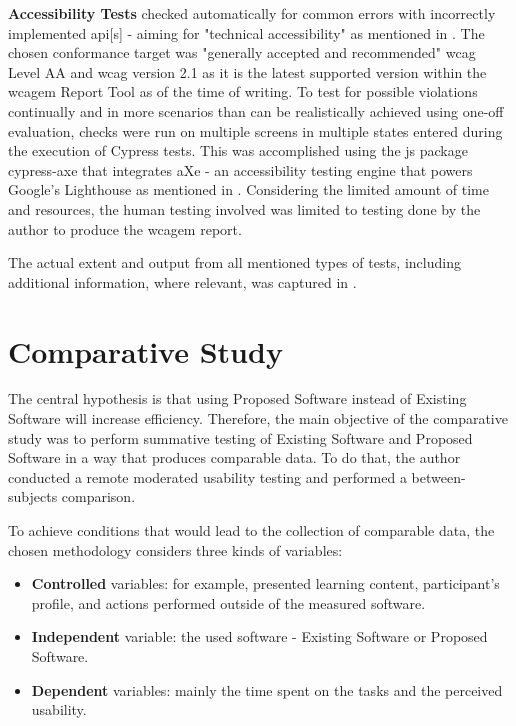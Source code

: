 \textbf{Accessibility Tests} checked automatically for common errors with incorrectly implemented \gls{api}[s] - aiming for "technical accessibility" as mentioned in .
The chosen conformance target was "generally accepted and recommended" \gls{wcag} Level AA \parencite{WAI_Evaluation_Methodology_Note} and \gls{wcag} version 2.1 as it is the latest supported version within the \gls{wcagem} Report Tool as of the time of writing.
To test for possible violations continually and in more scenarios than can be realistically achieved using one-off evaluation, checks were run on multiple screens in multiple states entered during the execution of Cypress tests.
This was accomplished using the \gls{js} package cypress-axe that integrates aXe - an accessibility testing engine that powers Google's Lighthouse as mentioned in .
Considering the limited amount of time and resources, the human testing involved was limited to testing done by the author to produce the \gls{wcagem} report.

The actual extent and output from all mentioned types of tests, including additional information, where relevant, was captured in .

\section{Comparative Study}

The central hypothesis is that using Proposed Software instead of Existing Software will increase efficiency.
Therefore, the main objective of the comparative study was to perform summative testing of Existing Software and Proposed Software in a way that produces comparable data.
To do that, the author conducted a remote moderated usability testing and performed a between-subjects comparison.

To achieve conditions that would lead to the collection of comparable data, the chosen methodology considers three kinds of variables:

\begin{itemize}
    \item \textbf{Controlled} variables: for example, presented learning content, participant's profile, and actions performed outside of the measured software.
    \item \textbf{Independent} variable: the used software - Existing Software or Proposed Software.
    \item \textbf{Dependent} variables: mainly the time spent on the tasks and the perceived usability.
\end{itemize}

